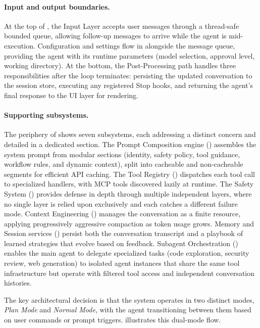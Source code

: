 \paragraph{Input and output boundaries.} At the top of , the Input Layer accepts user messages through a thread-safe bounded queue, allowing follow-up messages to arrive while the agent is mid-execution. Configuration and settings flow in alongside the message queue, providing the agent with its runtime parameters (model selection, approval level, working directory). At the bottom, the Post-Processing path handles three responsibilities after the loop terminates: persisting the updated conversation to the session store, executing any registered Stop hooks, and returning the agent's final response to the UI layer for rendering.

\paragraph{Supporting subsystems.} The periphery of  shows seven subsystems, each addressing a distinct concern and detailed in a dedicated section. The Prompt Composition engine () assembles the system prompt from modular sections (identity, safety policy, tool guidance, workflow rules, and dynamic context), split into cacheable and non-cacheable segments for efficient API caching. The Tool Registry () dispatches each tool call to specialized handlers, with MCP tools discovered lazily at runtime. The Safety System () provides defense in depth through multiple independent layers, where no single layer is relied upon exclusively and each catches a different failure mode. Context Engineering () manages the conversation as a finite resource, applying progressively aggressive compaction as token usage grows. Memory and Session services () persist both the conversation transcript and a playbook of learned strategies that evolve based on feedback. Subagent Orchestration () enables the main agent to delegate specialized tasks (code exploration, security review, web generation) to isolated agent instances that share the same tool infrastructure but operate with filtered tool access and independent conversation histories.

The key architectural decision is that the system operates in two distinct modes, \emph{Plan Mode} and \emph{Normal Mode}, with the agent transitioning between them based on user commands or prompt triggers.  illustrates this dual-mode flow.

